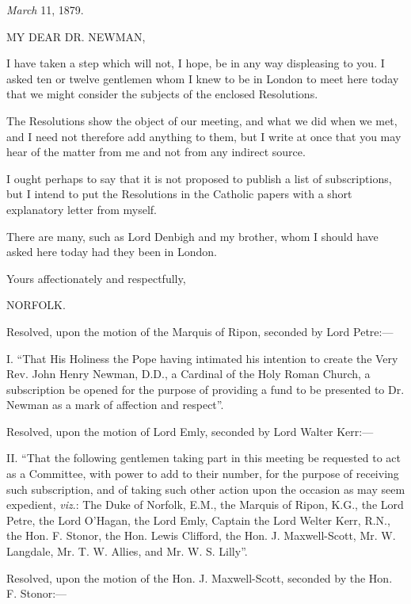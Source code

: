 

\emph{March} 11, 1879.

MY DEAR DR.
NEWMAN,

I have taken a step which will not, I hope, be in any way displeasing
to you. I asked ten or twelve gentlemen whom I knew to be in London to
meet here today that we might consider the subjects of the enclosed
Resolutions.

The Resolutions show the object of our meeting, and what we did
when we met, and I need not therefore add anything to them, but I
write at once that you may hear of the matter from me and not from any
indirect source.

I ought perhaps to say that it is not proposed to publish a list of
subscriptions, but I intend to put the Resolutions in the Catholic
papers with a short explanatory letter from myself.

There are many, such as Lord Denbigh and my brother, whom I should
have asked here today had they been in London.

Yours affectionately and respectfully,

NORFOLK.

Resolved, upon the motion of the Marquis of Ripon, seconded by Lord
Petre:—

I. ``That His Holiness the Pope having intimated his intention
to create the Very Rev. John Henry Newman, D.D., a Cardinal of the
Holy Roman Church, a subscription be opened for the purpose of
providing a fund to be presented to Dr. Newman as a mark of affection
and respect''.

Resolved, upon the motion of Lord Emly, seconded by Lord Walter
Kerr:—

II. ``That the following gentlemen taking part in this
meeting be requested to act as a Committee, with power to add to their
number, for the purpose of receiving such subscription, and of taking
such other action upon the occasion as may seem expedient, \emph{viz}.:
The Duke of Norfolk, E.M., the Marquis of Ripon, K.G., the Lord Petre,
the Lord O'Hagan, the Lord Emly, Captain the Lord Welter Kerr, R.N.,
the Hon. F. Stonor, the Hon. Lewis Clifford, the Hon. J.
Maxwell-Scott, Mr. W. Langdale, Mr. T. W. Allies, and Mr. W. S.
Lilly''.

Resolved, upon the motion of the Hon. J. Maxwell-Scott, seconded by
the Hon. F. Stonor:—

